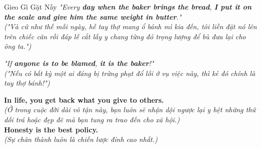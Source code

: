 \begin{truyen}{Gieo Gì Gặt Nấy}
\textit{"Every \textbf{day when the baker brings the bread}, \textbf{I put it on the scale and give him the same weight in butter}."}\\
\textit{("Và cứ như thế mỗi ngày, hễ tay thợ mang ổ bánh mì kia đến, tôi liền đặt nó lên trên chiếc cân rồi đáp lễ cắt lấy y chang từng đó trọng lượng để bù đưa lại cho ông ta.")}

\textit{"If \textbf{anyone is to be blamed}, \textbf{it is the baker}!"}\\
\textit{("Nếu có bất kỳ một ai đáng bị trừng phạt đổ lỗi ở vụ việc này, thì kẻ đó chính là tay thợ bánh!")}
\end{truyen}

\begin{baihoc}
  \textbf{In life, you get back what you give to others.}\\
  \textit{(Ở trong cuộc đời dài vô tận này, bạn luôn sẽ nhận dội ngược lại y hệt những thứ dối trá hoặc đẹp đẽ mà bạn tung ra trao đến cho xã hội.)}\\
  \textbf{Honesty is the best policy.}\\
  \textit{(Sự chân thành luôn là chiến lược đỉnh cao nhất.)}
\end{baihoc}
